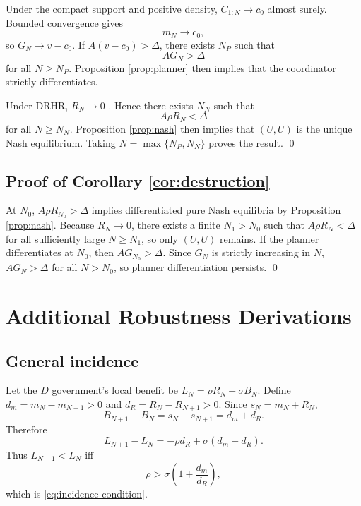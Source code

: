 Under the compact support and positive density, $C_{1:N}\to c_0$ almost surely. Bounded convergence gives
\begin{equation}
m_N\to c_0,
\end{equation}
so $G_N\to v-c_0$. If $A(v-c_0)>\Delta$, there exists $N_P$ such that
\begin{equation}
A G_N>\Delta
\end{equation}
for all $N\ge N_P$. Proposition \ref{prop:planner} then implies that the coordinator strictly differentiates.

Under DRHR, $R_N\to0$ \citep{XuLi2019}. Hence there exists $N_N$ such that
\begin{equation}
A\rho R_N<\Delta
\end{equation}
for all $N\ge N_N$. Proposition \ref{prop:nash} then implies that $(U,U)$ is the unique Nash equilibrium. Taking $\bar N=\max\{N_P,N_N\}$ proves the result. \qed

\subsection{Proof of Corollary \ref{cor:destruction}}

At $N_0$, $A\rho R_{N_0}>\Delta$ implies differentiated pure Nash equilibria by Proposition \ref{prop:nash}. Because $R_N\to0$, there exists a finite $N_1>N_0$ such that $A\rho R_N<\Delta$ for all sufficiently large $N\ge N_1$, so only $(U,U)$ remains. If the planner differentiates at $N_0$, then $A G_{N_0}>\Delta$. Since $G_N$ is strictly increasing in $N$, $A G_N>\Delta$ for all $N>N_0$, so planner differentiation persists. \qed

\section{Additional Robustness Derivations}
\label{app:robustness}

\subsection{General incidence}

Let the $D$ government's local benefit be $L_N=\rho R_N+\sigma B_N$. Define $d_m=m_N-m_{N+1}>0$ and $d_R=R_N-R_{N+1}>0$. Since $s_N=m_N+R_N$,
\begin{equation}
B_{N+1}-B_N=s_N-s_{N+1}=d_m+d_R.
\end{equation}
Therefore
\begin{equation}
L_{N+1}-L_N=-\rho d_R+\sigma(d_m+d_R).
\end{equation}
Thus $L_{N+1}<L_N$ iff
\begin{equation}
\rho>\sigma\left(1+\frac{d_m}{d_R}\right),
\end{equation}
which is \eqref{eq:incidence-condition}.


